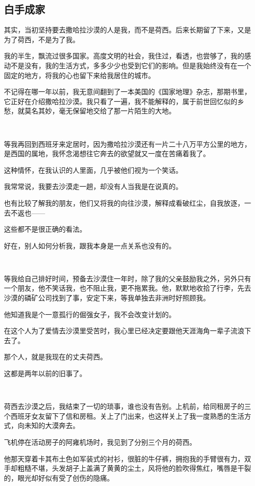 \subsection{白手成家}

\par 其实，当初坚持要去撒哈拉沙漠的人是我，而不是荷西。后来长期留了下来，又是为了荷西，不是为了我。
\par 我的半生，飘流过很多国家。高度文明的社会，我住过，看透，也尝够了，我的感动不是没有，我的生活方式，多多少少也受到它们的影响。但是我始终没有在一个固定的地方，将我的心也留下来给我居住的城市。
\par 不记得在哪一年以前，我无意间翻到了一本美国的《国家地理》杂志，那期书里，它正好在介绍撒哈拉沙漠。我只看了一遍，我不能解释的，属于前世回忆似的乡愁，就莫名其妙，毫无保留地交给了那一片陌生的大地。
\par  
\par 等我再回到西班牙来定居时，因为撒哈拉沙漠还有一片二十八万平方公里的地方，是西国的属地，我怀念渴想往它奔去的欲望就又一度在苦痛着我了。
\par 这种情怀，在我认识的人里面，几乎被他们视为一个笑话。
\par 我常常说，我要去沙漠走一趟，却没有人当我是在说真的。
\par 也有比较了解我的朋友，他们又将我的向往沙漠，解释成看破红尘，自我放逐，一去不返也——
\par 这些都不是很正确的看法。
\par 好在，别人如何分析我，跟我本身是一点关系也没有的。
\par  
\par 等我给自己排好时间，预备去沙漠住一年时，除了我的父亲鼓励我之外，另外只有一个朋友，他不笑话我，也不阻止我，更不拖累我。他，默默地收拾了行李，先去沙漠的磷矿公司找到了事，安定下来，等我单独去非洲时好照顾我。
\par 他知道我是个一意孤行的倔强女子，我不会改变计划的。
\par 在这个人为了爱情去沙漠里受苦时，我心里已经决定要跟他天涯海角一辈子流浪下去了。
\par 那个人，就是我现在的丈夫荷西。
\par 这都是两年以前的旧事了。
\par  
\par 荷西去沙漠之后，我结束了一切的琐事，谁也没有告别。上机前，给同租房子的三个西班牙女友留下了信和房租。关上了门出来，也这样关上了我一度熟悉的生活方式，向未知的大漠奔去。
\par 飞机停在活动房子的阿雍机场时，我见到了分别三个月的荷西。
\par 他那天穿着卡其布土色如军装式的衬衫，很脏的牛仔裤，拥抱我的手臂很有力，双手却粗糙不堪，头发胡子上盖满了黄黄的尘土，风将他的脸吹得焦红，嘴唇是干裂的，眼光却好似有受了创伤的隐痛。
